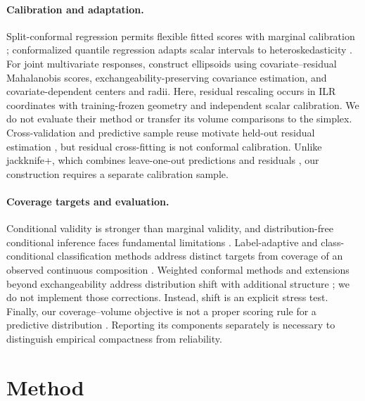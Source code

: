 \documentclass{article}
\begin{document}
\paragraph{Calibration and adaptation.}
Split-conformal regression permits flexible fitted scores with marginal calibration \citep{Lei2018}; conformalized quantile regression adapts scalar intervals to heteroskedasticity \citep{Romano2019}. For joint multivariate responses, \citet{Henderson2024} construct ellipsoids using covariate--residual Mahalanobis scores, exchangeability-preserving covariance estimation, and covariate-dependent centers and radii. Here, residual rescaling occurs in ILR coordinates with training-frozen geometry and independent scalar calibration. We do not evaluate their method or transfer its volume comparisons to the simplex. Cross-validation and predictive sample reuse motivate held-out residual estimation \citep{Stone1974,Geisser1975}, but residual cross-fitting is not conformal calibration. Unlike jackknife+, which combines leave-one-out predictions and residuals \citep{Barber2021Jackknife}, our construction requires a separate calibration sample.

\paragraph{Coverage targets and evaluation.}
Conditional validity is stronger than marginal validity, and distribution-free conditional inference faces fundamental limitations \citep{Vovk2012,Barber2021Limits}. Label-adaptive and class-conditional classification methods address distinct targets from coverage of an observed continuous composition \citep{Romano2020,Ding2023}. Weighted conformal methods and extensions beyond exchangeability address distribution shift with additional structure \citep{Tibshirani2019,Barber2023}; we do not implement those corrections. Instead, shift is an explicit stress test. Finally, our coverage--volume objective is not a proper scoring rule for a predictive distribution \citep{Gneiting2007}. Reporting its components separately is necessary to distinguish empirical compactness from reliability.

\section{Method}
\end{document}
